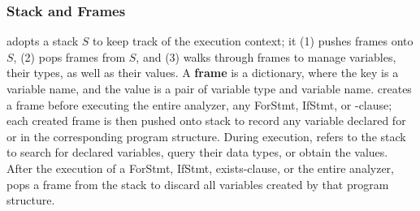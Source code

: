 \vspace{-.5em}
\subsubsection{Stack and Frames}
\label{sec:data-structure}
\tool adopts a stack $S$ to keep track of the execution context; it (1) pushes frames onto $S$, (2) pops frames from $S$, and (3) walks through frames to manage variables, their types, as well as their values. A \textbf{frame} is a dictionary, where the key is a variable name, and the value is a pair of variable type and variable name.
\tool creates a frame before executing the entire analyzer, any ForStmt, IfStmt, or -clause; each created frame is then pushed onto stack to record any variable declared for or in the corresponding program structure. During execution, 
\tool refers to the stack to search for declared variables, query their data types, or obtain the values. 
After the execution of a ForStmt, IfStmt, exists-clause, or the entire analyzer, \tool pops a frame from the stack to discard all variables created by that program structure. 


